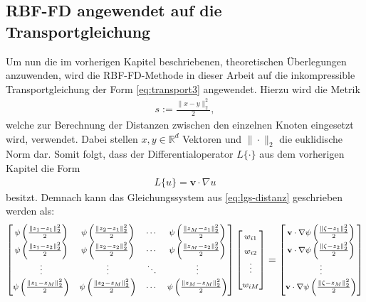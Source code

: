 \documentclass[12pt,titlepage]{article}
\begin{document}
\subsection{RBF-FD angewendet auf die Transportgleichung}
Um nun die im vorherigen Kapitel beschriebenen, theoretischen Überlegungen anzuwenden, wird die RBF-FD-Methode in dieser Arbeit auf die inkompressible Transportgleichung der Form \eqref{eq:transport3} angewendet. Hierzu wird die Metrik
\begin{align}
 s:=\frac{\|x-y\|_2^2}{2},
\end{align}
welche zur Berechnung der Distanzen zwischen den einzelnen Knoten eingesetzt wird, verwendet. Dabei stellen $x,y\in\mathbb{R}^d$  Vektoren und $\|\cdot\|_2$ die euklidische Norm dar. Somit folgt, dass der Differentialoperator $L\{\cdot\}$ aus dem vorherigen Kapitel die Form
\begin{align}
 L\{u\}=\textbf{v}\cdot\nabla u
\end{align}
besitzt. Demnach kann das Gleichungssystem aus \eqref{eq:lgs-distanz} geschrieben werden als:
\begin{align*}
\renewcommand\arraystretch{1.57}
{\footnotesize
\begin{bmatrix}
  \psi\left(\frac{\|z_1-z_1\|_2^2}{2}\right) & \psi\left(\frac{\|z_2-z_1\|_2^2}{2}\right) & \cdots & \psi\left(\frac{\|z_M-z_1\|_2^2}{2}\right) \\
 \psi\left(\frac{\|z_1-z_2\|_2^2}{2}\right) & \psi\left(\frac{\|z_2-z_2\|_2^2}{2}\right) & \cdots & \psi\left(\frac{\|z_M-z_2\|_2^2}{2}\right) \\
 \vdots & \vdots & \ddots & \vdots \\
 \psi\left(\frac{\|z_1-z_M\|_2^2}{2}\right) & \psi\left(\frac{\|z_2-z_M\|_2^2}{2}\right) & \cdots & \psi\left(\frac{\|z_M-z_M\|_2^2}{2}\right)
\end{bmatrix}
\begin{bmatrix}
 w_{i1} \\
 w_{i2} \\
 \vdots \\
 w_{iM}
\end{bmatrix}
=
\begin{bmatrix}
 \textbf{v}\cdot\nabla\psi\left(\frac{\|\zeta-z_1\|_2^2}{2}\right) \\
 \textbf{v}\cdot\nabla\psi\left(\frac{\|\zeta-z_2\|_2^2}{2}\right) \\
 \vdots \\
 \textbf{v}\cdot\nabla\psi\left(\frac{\|\zeta-z_M\|_2^2}{2}\right)
\end{bmatrix}
}
\end{align*}
\end{document}
